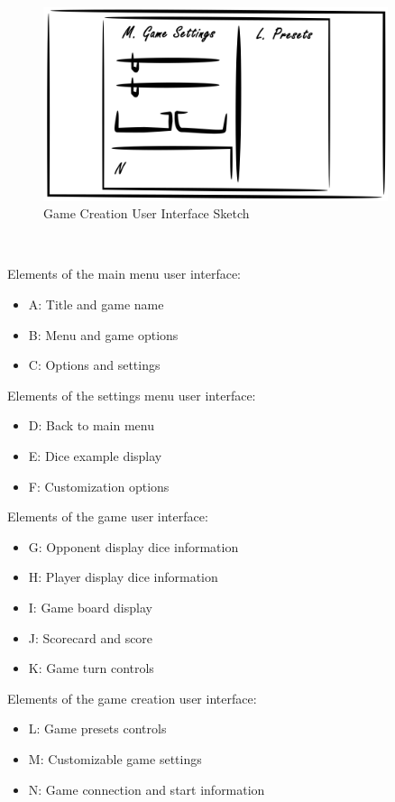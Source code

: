 \documentclass[12pt, titlepage]{article}
\begin{document}
\begin{figure}[h!]
\caption{Game Creation User Interface Sketch}
\centering
\includegraphics[width=0.9\textwidth]{figures/game_creation}
\end{figure}



~
\newpage
~
\newpage

\noindent
Elements of the main menu user interface:
\begin{itemize}
  \item A: Title and game name
  \item B: Menu and game options
  \item C: Options and settings
\end{itemize}
Elements of the settings menu user interface:
\begin{itemize}
  \item D: Back to main menu
  \item E: Dice example display
  \item F: Customization options
\end{itemize}
Elements of the game user interface:
\begin{itemize}
  \item G: Opponent display dice information
  \item H: Player display dice information
  \item I: Game board display
  \item J: Scorecard and score
  \item K: Game turn controls
\end{itemize}
Elements of the game creation user interface:
\begin{itemize}
  \item L: Game presets controls
  \item M: Customizable game settings
  \item N: Game connection and start information
\end{itemize}
\end{document}
